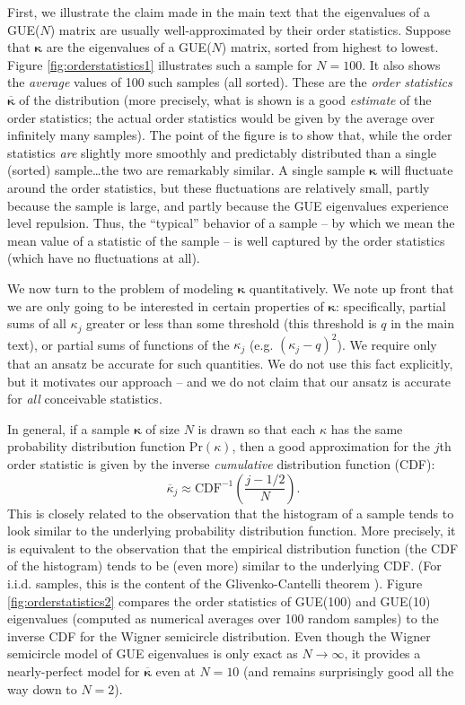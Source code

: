 \documentclass[aps,pra, twocolumn]{revtex4}
\newcommand{\bvec}[1]{\boldsymbol{#1}}
\begin{document}
First, we illustrate the claim made in the main text that the eigenvalues of a GUE($N$) matrix are usually well-approximated by their order statistics.  Suppose that $\bvec{\kappa}$ are the eigenvalues of a GUE($N$) matrix, sorted from highest to lowest.  Figure \ref{fig:orderstatistics1} illustrates such a sample for $N=100$.  It also shows the \emph{average} values of 100 such samples (all sorted).  These are the \emph{order statistics} $\overline{\bvec{\kappa}}$ of the distribution (more precisely, what is shown is a good \emph{estimate} of the order statistics; the actual order statistics would be given by the average over infinitely many samples).  The point of the figure is to show that, while the order statistics \emph{are} slightly more smoothly and predictably distributed than a single (sorted) sample\ldots the two are remarkably similar.  A single sample $\bvec{\kappa}$ will fluctuate around the order statistics, but these fluctuations are relatively small, partly because the sample is large, and partly because the GUE eigenvalues experience level repulsion.  Thus, the ``typical'' behavior of a sample -- by which we mean the mean value of a statistic of the sample -- is well captured by the order statistics (which have no fluctuations at all).

We now turn to the problem of modeling $\bvec{\kappa}$ quantitatively.  We note up front that we are only going to be interested in certain properties of $\bvec{\kappa}$:  specifically, partial sums of all $\kappa_j$ greater or less than some threshold (this threshold is $q$ in the main text), or partial sums of functions of the $\kappa_j$ (e.g. $(\kappa_j-q)^2$).  We require only that an ansatz be accurate for such quantities.  We do not use this fact explicitly, but it motivates our approach -- and we do not claim that our ansatz is accurate for \emph{all} conceivable statistics.

In general, if a sample $\bvec{\kappa}$ of size $N$ is drawn so that each $\kappa$ has the same probability distribution 
function $\mathrm{Pr}(\kappa)$, then a good approximation for the $j$th order statistic is given by the inverse 
\emph{cumulative} distribution function (CDF):
\begin{equation}
\overline{\kappa}_j \approx \mathrm{CDF}^{-1}\left(\frac{j-1/2}{N}\right).
\end{equation}
This is closely related to the observation that the histogram of a sample tends to look similar to the underlying probability distribution function.  More precisely, it is equivalent to the observation that the empirical distribution function (the CDF of the histogram) tends to be (even more) similar to the underlying CDF.  (For i.i.d. samples, this is the content of the Glivenko-Cantelli theorem \cite{VanderVaart2000}).  Figure \ref{fig:orderstatistics2} compares the order statistics of GUE(100) and GUE(10) eigenvalues (computed as numerical averages over 100 random samples) to the inverse CDF for the Wigner semicircle distribution.  Even though the Wigner semicircle model of GUE eigenvalues is only exact as $N\to\infty$, it provides a nearly-perfect model for $\overline{\bvec{\kappa}}$ even at $N=10$ (and remains surprisingly good all the way down to $N=2$).
\end{document}
